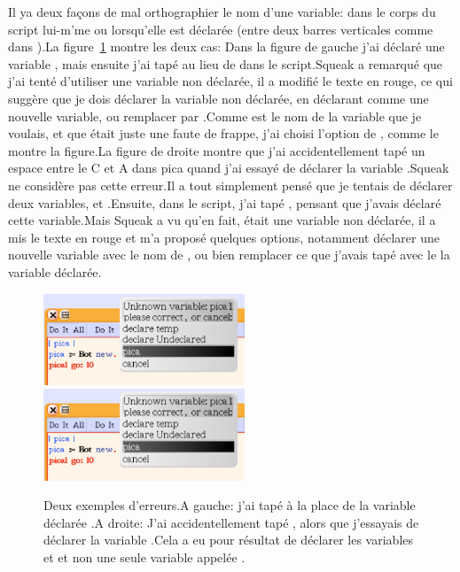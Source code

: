 \documentclass[a4paper,10pt,twoside]{book}
\begin{document}
Il ya deux fa\c cons de mal orthographier le nom d'une variable: dans le corps du script lui-m'me ou lorsqu'elle est d\'eclar\'ee (entre deux barres verticales comme dans ).La figure~\ref{fig:twoErrors} montre les deux cas: Dans la figure de gauche j'ai d\'eclar\'e une variable , mais ensuite j'ai tap\'e au lieu de  dans le script.Squeak a remarqu\'e que j'ai tent\'e d'utiliser une variable non d\'eclar\'ee, il a modifi\'e le texte en rouge, ce qui sugg\`ere que je dois d\'eclarer la variable non d\'eclar\'ee, en d\'eclarant  comme une nouvelle variable, ou remplacer  par .Comme  est le nom de la variable que je voulais, et que  \'etait juste une faute de frappe, j'ai choisi l'option de , comme le montre la figure.La figure de droite montre que j'ai accidentellement tap\'e un espace entre le C et A dans pica quand j'ai essay\'e de d\'eclarer la variable .Squeak ne consid\`ere pas cette erreur.Il a tout simplement pens\'e que je tentais de d\'eclarer deux variables,  et .Ensuite, dans le script, j'ai tap\'e , pensant que j'avais d\'eclar\'e cette variable.Mais Squeak a vu qu'en fait,  \'etait une variable non d\'eclar\'ee, il a mis le texte en rouge et m'a propos\'e quelques options, notamment d\'eclarer une nouvelle variable avec le nom de , ou bien remplacer ce que j'avais tap\'e avec le la variable  d\'eclar\'ee.

\begin{figure}[ht!]
\begin{center}\includegraphics[width=6cm]{mispellVariable}\includegraphics[width=6cm]{mispellVariable}
\caption{Deux exemples d'erreurs.A gauche: j'ai tap\'e  \`a la place de la variable d\'eclar\'ee .A droite: J'ai accidentellement tap\'e , alors que j'essayais de d\'eclarer la variable .Cela a eu pour r\'esultat de d\'eclarer les variables  et  et non une seule variable appel\'ee . \label{fig:twoErrors}}\end{center}
\end{figure}
\end{document}
